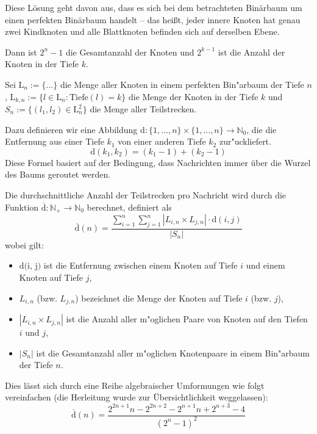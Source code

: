 \begin{enumerate}
        Diese Lösung geht davon aus, dass es sich bei dem betrachteten
        Binärbaum um einen perfekten Binärbaum handelt – das heißt, jeder
        innere Knoten hat genau zwei Kindknoten und alle Blattknoten befinden
        sich auf derselben Ebene.

        Dann ist $2^n - 1$ die Gesamtanzahl der Knoten und $2^{k - 1}$ ist die
        Anzahl der Knoten in der Tiefe $k$.

        Sei $\text{L}_n := \{ ... \}$ die Menge aller Knoten in einem perfekten
        Bin"arbaum der Tiefe $n$, $\text{L}_{k,n} := \{ l \in \text{L}_n :
        \text{Tiefe}(l) = k \}$ die Menge der Knoten in der Tiefe $k$ und
        $S_n := \{(l_1, l_2) \in \text{L}_n^2\}$ die Menge aller Teilstrecken.

        Dazu definieren wir eine Abbildung $\text{d} : \{1,...,n\} \times
        \{1,...,n\} \rightarrow \mathbb{N}_0$, die die Entfernung aus einer
        Tiefe $k_1$ von einer anderen Tiefe $k_2$ zur"uckliefert.
        \begin{equation*}
            \text{d}(k_1, k_2) = (k_1 - 1) + (k_2 - 1)
        \end{equation*}
        Diese Formel basiert auf der Bedingung, dass Nachrichten immer über die
        Wurzel des Baums geroutet werden.

        Die durchschnittliche Anzahl der Teilstrecken pro Nachricht wird durch
        die Funktion $\overline{\text{d}} : \mathbb{N}_{+}
        \rightarrow \mathbb{N}_{0}$ berechnet, definiert als
        \begin{equation*}
            \overline{\text{d}}(n) = \dfrac{\sum_{i = 1}^n \sum_{j = 1}^n |L_{i,n}
                \times L_{j,n}| \cdot \text{d}(i, j)}{|S_n|}
        \end{equation*}
        wobei gilt:
        \begin{itemize}
            \item $\text{d(i, j)}$ ist die Entfernung zwischen einem Knoten auf
                Tiefe $i$ und einem Knoten auf Tiefe $j$,
            \item $L_{i,n}$ (bzw. $L_{j,n}$) bezeichnet die Menge der Knoten auf Tiefe $i$ (bzw. $j$),
            \item $|L_{i,n} \times L_{j,n}|$ ist die Anzahl aller m"oglichen Paare von
                Knoten auf den Tiefen $i$ und $j$,
            \item $|S_n|$ ist die Gesamtanzahl aller m"oglichen Knotenpaare in
                einem Bin"arbaum der Tiefe $n$.
        \end{itemize}
        Dies lässt sich durch eine Reihe algebraischer Umformungen wie folgt
        vereinfachen (die Herleitung wurde zur Übersichtlichkeit weggelassen):
        \begin{equation*}
            \overline{\text{d}}(n) = \dfrac{2^{2n + 1}n - 2^{2n + 2} - 2^{n + 1}n + 2^{n + 3} - 4}{(2^n - 1)^2}
        \end{equation*}
\end{enumerate}

